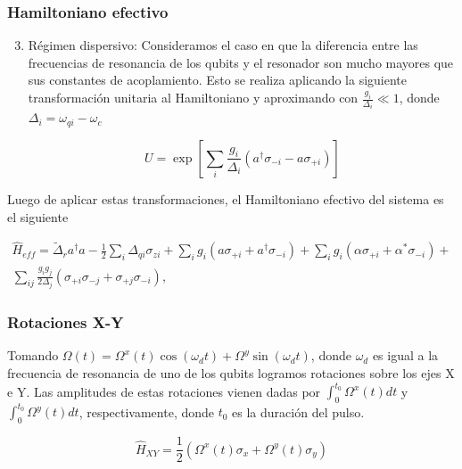 \documentclass[xetex,mathserif,serif, 8pt]{beamer}
\begin{document}
\begin{frame}
    \frametitle{Hamiltoniano efectivo}

    \begin{enumerate}
        \setcounter{enumi}{2}
        \item Régimen dispersivo: Consideramos el caso en que la diferencia entre las frecuencias de resonancia de los qubits y el resonador son mucho mayores que sus constantes de acoplamiento. Esto se realiza aplicando la siguiente transformación unitaria al Hamiltoniano y aproximando con $\frac{g_i}{\Delta_i} \ll 1$, donde $\Delta_i = \omega_{qi} - \omega_c$

    
            \begin{equation}
                U = \exp[\sum\limits_i \frac{g_i} {\Delta_i} (a^\dagger \sigma_{-i} - a \sigma_{+i})]
            \end{equation}

    \end{enumerate}

    Luego de aplicar estas transformaciones, el Hamiltoniano efectivo del sistema es el siguiente

    \begin{multline}
    \hat{H}_{eff} = \tilde{\Delta}_r a^\dagger a - \frac{1}{2} \sum\limits_i \Delta_{qi} \sigma_{zi} + \sum\limits_i g_i (a \sigma_{+i} + a^\dagger \sigma_{-i}) + \sum\limits_i g_i (\alpha \sigma_{+i} + \alpha^* \sigma_{-i}) + \\
    \sum\limits_{ij} \frac{g_i g_j}{2 \Delta_j} \left(\sigma_{+i} \sigma_{-j} + \sigma_{+j} \sigma_{-i}\right) ,
    \end{multline}

\end{frame}
 
\begin{frame}
    \frametitle{Rotaciones X-Y}

    \justify
    Tomando $\Omega(t) = \Omega^x(t) \cos(\omega_d t) + \Omega^y \sin(\omega_d t)$,
    donde $\omega_d$ es igual a la frecuencia de resonancia de uno de los qubits
    logramos rotaciones sobre los ejes X e Y. Las amplitudes de estas rotaciones
    vienen dadas por $\int_0^{t_0} \Omega^x(t) dt$ y $\int_0^{t_0} \Omega^y(t)
    dt$, respectivamente, donde $t_0$ es la duración del pulso.

    \begin{equation}
        \hat{H}_{XY} = \frac{1}{2} (\Omega^x(t) \sigma_x + \Omega^y(t) \sigma_y)
    \end{equation}

\end{frame}
  
\end{document}
